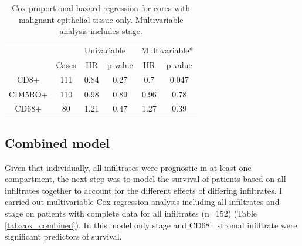 \begin{table}[]
    \centering
    \begin{tabular}{cccccc}\hline 	&		&	\multicolumn{2}{l}{Univariable}			&	\multicolumn{2}{l}{Multivariable*}			\\
 	&	Cases	&	HR	&	p-value	&	HR	&	p-value	\\ \hline
CD8+	&	111	&	0.84	&	0.27	&	0.7	&	0.047	\\
CD45RO+	&	110	&	0.98	&	0.89	&	0.96	&	0.78	\\
CD68+	&	80	&	1.21	&	0.47	&	1.27	&	0.39	\\
\hline
    \end{tabular}
    \caption[Epithelial core immune infiltrate and survival]{Cox proportional hazard regression for cores with malignant epithelial tissue only. Multivariable analysis includes stage.}
    \label{tab:surv_cd8_epi}
\end{table}


\subsection{Combined model}

Given that individually, all infiltrates were prognostic in at least one compartment, the next step was to model the survival of patients based on all infiltrates together to account for the different effects of differing infiltrates. I carried out multivariable Cox regression analysis including all infiltrates and stage on patients with complete data for all infiltrates (n=152) (Table \ref{tab:cox_combined}).  In this model only stage and CD68$^+$ stromal infiltrate were significant predictors of survival.

